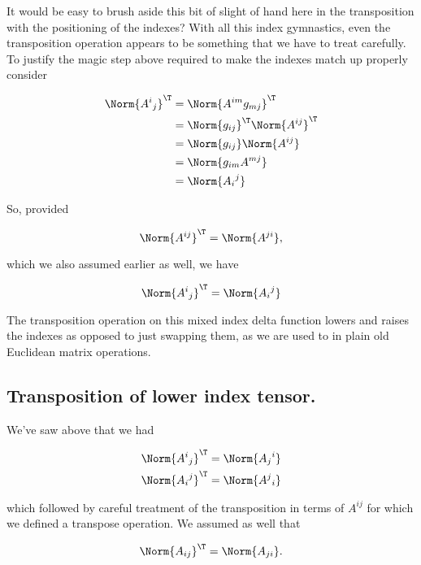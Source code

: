 It would be easy to brush aside this bit of slight of hand here in the transposition with the positioning of the indexes?  With all this index gymnastics, even the transposition operation appears to be something that we have to treat carefully.  To justify the magic step above required to make the indexes match up properly consider

\begin{align*}
\Norm{{A^i}_j}^\T
&=
\Norm{ A^{im} g_{mj} }^\T \\
&=
\Norm{ g_{ij} }^\T
\Norm{ A^{ij} }^\T 
 \\
&=
\Norm{ g_{ij} }
\Norm{ A^{ij} }
 \\
&=
\Norm{ g_{im} A^{mj} }
 \\
&=
\Norm{ {A_{i}}^j }
\end{align*}

So, provided 

\begin{equation}\label{eqn:relativisticElectrodynamicsL11:980}
\Norm{A^{ij}}^\T = \Norm{A^{ji}},
\end{equation}

which we also assumed earlier as well, we have

\begin{equation}\label{eqn:relativisticElectrodynamicsL11:1001}
\Norm{{A^i}_j}^\T =
\Norm{ {A_{i}}^j }
\end{equation}

The transposition operation on this mixed index delta function lowers and raises the indexes as opposed to just swapping them, as we are used to in plain old Euclidean  matrix operations.

\subsection{Transposition of lower index tensor.}

We've saw above that we had

\begin{align}\label{eqn:relativisticElectrodynamicsL11:1022}
\Norm{ {A^{i}}_j }^\T &= \Norm{ {A_{j}}^i } \\
\Norm{ {A_{i}}^j }^\T &= \Norm{ {A^{j}}_i } 
\end{align}

which followed by careful treatment of the transposition in terms of $A^{ij}$ for which we defined a transpose operation.  We assumed as well that

\begin{equation}\label{eqn:relativisticElectrodynamicsL11:1042}
\Norm{ A_{ij} }^\T = \Norm{ A_{ji} }.
\end{equation}

